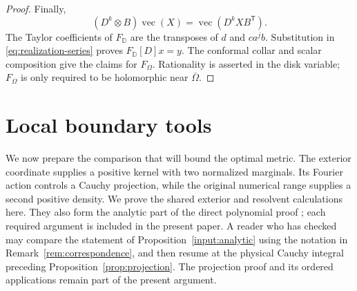 \documentclass[11pt]{article}
\newcommand{\D}{\mathbb D}
\DeclareMathOperator{\vecop}{vec}
\theoremstyle{definition}
\theoremstyle{remark}
\numberwithin{equation}{section}
\begin{document}
\begin{proof}
Finally,
\[
 (D^k\otimes B)\vecop(X)=\vecop(D^kXB^{\mathsf T}).
\]
The Taylor coefficients of $F_\D$ are the transposes of $d$ and
$ca^jb$. Substitution in \eqref{eq:realization-series} proves
$F_\D[D]x=y$. The conformal collar and scalar composition give the
claims for $F_\Omega$. Rationality is asserted in the disk variable;
$F_\Omega$ is only required to be holomorphic near $\overline\Omega$.
\end{proof}

\section{Local boundary tools}\label{sec:inputs}
We now prepare the comparison that will bound the optimal metric. The
exterior coordinate supplies a positive kernel with two normalized marginals.
Its Fourier action controls a Cauchy projection, while the original numerical
range supplies a second positive density. We prove the shared exterior and
resolvent calculations here. They also form the analytic part of the direct
polynomial proof \cite[Sections 2--3]{Direct}; each required argument is
included in the present paper. A reader who has checked
\cite[Theorems~2.1 and~3.1]{Direct} may compare the statement of
Proposition~\ref{input:analytic} using the notation in
Remark~\ref{rem:correspondence}, and then resume at the physical Cauchy
integral preceding Proposition~\ref{prop:projection}. The projection
proof and its ordered applications remain part of the present argument.
\end{document}
